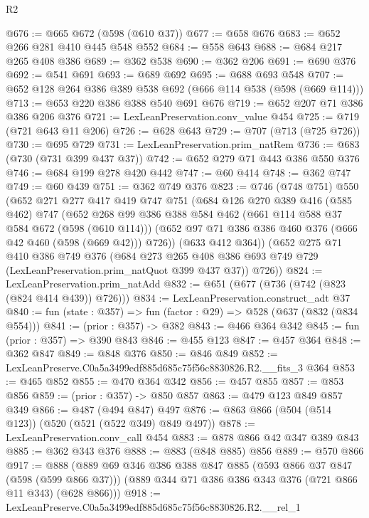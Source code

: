\begin{lexlean}{R2}
\begin{coremodule}
@676 := @665 @672 (@598 (@610 @37))
@677 := @658 @676
@683 := @652 @266 @281 @410 @445 @548 @552
@684 := @558 @643
@688 := @684 @217 @265 @408 @386
@689 := @362 @538
@690 := @362 @206
@691 := @690 @376
@692 := @541 @691
@693 := @689 @692
@695 := @688 @693 @548
@707 := @652 @128 @264 @386 @389 @538 @692 (@666 @114 @538 (@598 (@669 @114)))
@713 := @653 @220 @386 @388 @540 @691 @676
@719 := @652 @207 @71 @386 @386 @206 @376
@721 := LexLeanPreservation.conv_value @454
@725 := @719 (@721 @643 @11 @206)
@726 := @628 @643
@729 := @707 (@713 (@725 @726))
@730 := @695 @729
@731 := LexLeanPreservation.prim_natRem
@736 := @683 (@730 (@731 @399 @437 @37))
@742 := @652 @279 @71 @443 @386 @550 @376
@746 := @684 @199 @278 @420 @442
@747 := @60 @414
@748 := @362 @747
@749 := @60 @439
@751 := @362 @749 @376
@823 := @746
    (@748 @751)
    @550
    (@652
      @271
      @277
      @417
      @419
      @747
      @751
      (@684
        @126
        @270
        @389
        @416
        (@585 @462)
        @747
        (@652
          @268
          @99
          @386
          @388
          @584
          @462
          (@661 @114 @588 @37 @584 @672 (@598 (@610 @114)))
          (@652 @97 @71 @386 @386 @460 @376 (@666 @42 @460 (@598 (@669 @42))) @726))
        (@633 @412 @364))
      (@652
        @275
        @71
        @410
        @386
        @749
        @376
        (@684 @273 @265 @408 @386 @693 @749 @729 (LexLeanPreservation.prim_natQuot @399 @437 @37))
        @726))
@824 := LexLeanPreservation.prim_natAdd
@832 := @651 (@677 (@736 (@742 (@823 (@824 @414 @439)) @726)))
@834 := LexLeanPreservation.construct_adt @37
@840 := fun (state : @357) => fun (factor : @29) => @528 (@637 (@832 (@834 @554)))
@841 := (prior : @357) -> @382
@843 := @466 @364 @342
@845 := fun (prior : @357) => @390 @843
@846 := @455 @123
@847 := @457 @364
@848 := @362 @847
@849 := @848 @376
@850 := @846 @849
@852 := LexLeanPreserve.C0a5a3499edf885d685c75f56c8830826.R2.__fits_3 @364
@853 := @465 @852
@855 := @470 @364 @342
@856 := @457 @855
@857 := @853 @856
@859 := (prior : @357) -> @850 @857
@863 := @479 @123 @849 @857 @349
@866 := @487 (@494 @847) @497
@876 := @863 @866 (@504 (@514 @123)) (@520 (@521 (@522 @349) @849 @497))
@878 := LexLeanPreservation.conv_call @454
@883 := @878 @866 @42 @347 @389 @843
@885 := @362 @343 @376
@888 := @883 (@848 @885) @856
@889 := @570 @866
@917 := @888
    (@889
      @69
      @346
      @386
      @388
      @847
      @885
      (@593 @866 @37 @847 (@598 (@599 @866 @37)))
      (@889 @344 @71 @386 @386 @343 @376 (@721 @866 @11 @343) (@628 @866)))
@918 := LexLeanPreserve.C0a5a3499edf885d685c75f56c8830826.R2.__rel_1

\end{coremodule}
\end{lexlean}
